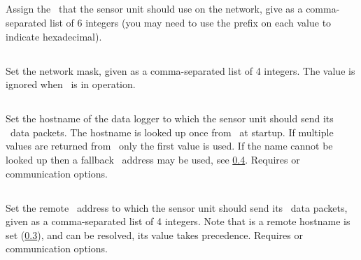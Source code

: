 \subsection[local-mac-address]{}

Assign the \macAddress\ that the sensor unit should use on the
network, give as a comma-separated list of 6 integers (you may need to use the
 prefix on each value to indicate hexadecimal).

\subsection[netmask]{}

Set the network mask, given as a comma-separated list of 4
integers. The value is ignored when \dhcp\ is in operation.


\subsection[remote-hostname]{}
\label{sec:eeprom-remote-hostname}

Set the hostname of the data logger to which the sensor unit should send its
\udp\ data packets. The hostname is looked up once from \dns\ at startup. If
multiple values are returned from \dns\ only the first value is used. If the
name cannot be looked up then a fallback \ip\ address may be used, see
\ref{sec:eeprom-remote-ip-address}. Requires  or 
communication options.


\subsection[remote-ip-address]{}
\label{sec:eeprom-remote-ip-address}

Set the remote \ip\ address to which the sensor unit should send its
\udp\ data packets, given as a comma-separated list of 4 integers. Note that is
a remote hostname is set (\ref{sec:eeprom-remote-hostname}), and can be
resolved, its value takes
precedence. Requires  or 
communication options.


